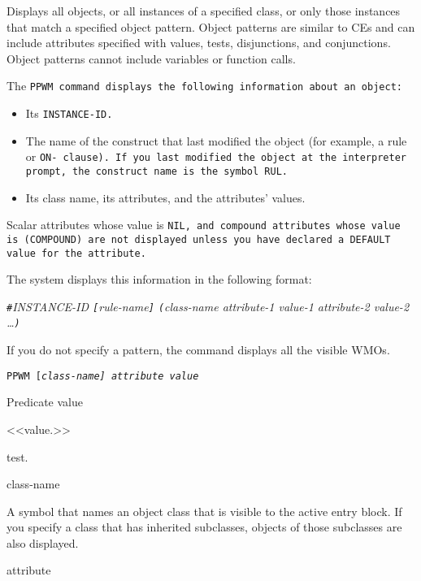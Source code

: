 {{Displays all objects, or all instances of a specified class, or only
those instances that match a specified object pattern. Object patterns
are similar to CEs and can include attributes specified with values,
tests, disjunctions, and conjunctions. Object patterns cannot include
variables or function calls.

The \tt{PPWM} command displays the following information about an
object:
\begin{itemize}
\item Its \tt{INSTANCE-ID}.

\item The name of the construct that last modified the object (for
  example, a rule or \tt{ON-} clause). If you last modified the object at
  the interpreter prompt, the construct name is the symbol \tt{RUL}.

\item Its class name, its attributes, and the attributes' values.
\end{itemize}

Scalar attributes whose value is \tt{NIL}, and compound attributes
whose value is \tt{(COMPOUND)} are not displayed unless you have
declared a \tt{DEFAULT} value for the attribute.

The system displays this information in the following format:

\begin{center}
  \verb|#|\it{INSTANCE-ID} \verb|[|\it{rule-name}\verb|]| \verb|(|\it{class-name}
  \it{attribute-1} \it{value-1} \it{attribute-2} \it{value-2} \ldots\verb|)|
\end{center}

If you do not specify a pattern, the command displays all the visible
WMOs.

\Format

\tt{PPWM} [\it{class-name}] \ct\it{attribute} \it{value}

Predicate value

<<value.>>

{test.}

\begin{arguments}
\item[class-name]

  A symbol that names an object class that is visible to the active
  entry block. If you specify a class that has inherited subclasses,
  objects of those subclasses are also displayed.

\item[attribute]


\end{arguments}}}
